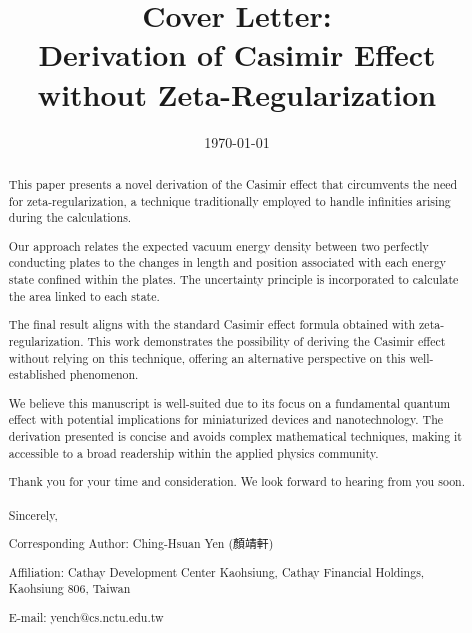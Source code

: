 \documentclass[12pt]{revtex4-2}
\begin{document}
\title{Cover Letter:\\Derivation of Casimir Effect without Zeta-Regularization}

\date{\today}

\begin{abstract}
This paper presents a novel derivation of the Casimir effect that circumvents the need for zeta-regularization, a technique traditionally employed to handle infinities arising during the calculations. 

Our approach relates the expected vacuum energy density between two perfectly conducting plates to the changes in length and position associated with each energy state confined within the plates. The uncertainty principle is incorporated to calculate the area linked to each state.

The final result aligns with the standard Casimir effect formula obtained with zeta-regularization. This work demonstrates the possibility of deriving the Casimir effect without relying on this technique, offering an alternative perspective on this well-established phenomenon.

We believe this manuscript is well-suited due to its focus on a fundamental quantum effect with potential implications for miniaturized devices and nanotechnology. The derivation presented is concise and avoids complex mathematical techniques, making it accessible to a broad readership within the applied physics community.

Thank you for your time and consideration. We look forward to hearing from you soon.
\\
\\
Sincerely,

\noindent Corresponding Author: Ching-Hsuan Yen (顏靖軒)

\noindent Affiliation: Cathay Development Center Kaohsiung, Cathay Financial Holdings, Kaohsiung 806, Taiwan

\noindent E-mail: yench@cs.nctu.edu.tw

\end{abstract}

\maketitle
\end{document}
